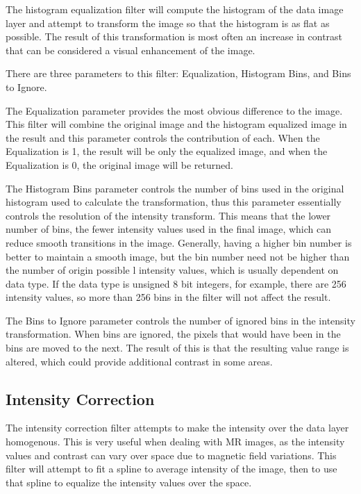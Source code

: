 \documentclass[fleqn,11pt,openany]{book}
\begin{document}
The histogram equalization filter will compute the histogram of the data image layer and attempt to transform the image so that the histogram is as flat as possible.  The result of this transformation is most often an increase in contrast that can be considered a visual enhancement of the image.  

There are three parameters to this filter:  Equalization, Histogram Bins, and Bins to Ignore.  

The Equalization parameter provides the most obvious difference to the image.  This filter will combine the original image and the histogram equalized image in the result and this parameter controls the contribution of each.  When the Equalization is 1, the result will be only the equalized image, and when the Equalization is 0, the original image will be returned.  

The Histogram Bins parameter controls the number of bins used in the original histogram used to calculate the transformation, thus this parameter essentially controls the resolution of the intensity transform.   This means that the lower number of bins, the fewer intensity values used in the final image, which can reduce smooth transitions in the image.  Generally, having a higher bin number is better to maintain a smooth image, but the bin number need not be higher than the number of origin possible l intensity values, which is usually dependent on data type.  If the data type is unsigned 8 bit integers, for example, there are 256 intensity values, so more than 256 bins in the filter will not affect the result.  

The Bins to Ignore parameter controls the number of ignored bins in the intensity transformation. When bins are ignored, the pixels that would have been in the bins are moved to the next.  The result of this is that the resulting value range is altered, which could provide additional contrast in some areas.  

\subsection{Intensity Correction}

The intensity correction filter attempts to make the intensity over the data layer homogenous.  This is very useful when dealing with MR images, as the intensity values and contrast can vary over space due to magnetic field variations.  This filter will attempt to fit a spline to average intensity of the image, then to use that spline to equalize the intensity values over the space.  
\end{document}
